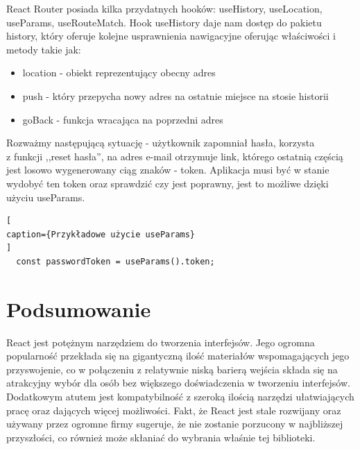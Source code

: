 \documentclass[oneside,polski,logo,indent]{amuthesis}
\begin{document}
React Router posiada kilka przydatnych hooków: useHistory, useLocation, useParams, useRouteMatch. Hook useHistory daje nam dostęp do pakietu history, który oferuje kolejne usprawnienia 
nawigacyjne oferując właściwości i metody takie jak:
\begin{itemize}
\item location - obiekt reprezentujący obecny adres
\item push - który przepycha nowy adres na ostatnie miejsce na stosie historii
\item goBack - funkcja wracająca na poprzedni adres
\end{itemize}
Rozważmy następującą sytuację - użytkownik zapomniał hasła, korzysta \\z funkcji ,,reset hasła'', na adres e-mail otrzymuje link, którego ostatnią częścią
jest losowo wygenerowany ciąg znaków - token. Aplikacja musi być w stanie wydobyć ten token oraz sprawdzić czy jest poprawny, jest to możliwe dzięki użyciu useParams.
\begin{lstlisting}[
caption={Przykładowe użycie useParams}
]
  const passwordToken = useParams().token;

\end{lstlisting}




\section{Podsumowanie}
React jest potężnym narzędziem do tworzenia interfejsów. Jego ogromna popularność przekłada się na gigantyczną ilość materiałów wspomagających jego przyswojenie, co w połączeniu z relatywnie niską barierą wejścia składa się na atrakcyjny wybór dla osób bez większego doświadczenia w tworzeniu interfejsów.
Dodatkowym atutem jest kompatybilność z szeroką ilością narzędzi ułatwiających pracę oraz dających więcej możliwości. Fakt, że React jest stale rozwijany oraz używany przez ogromne firmy
sugeruje, że nie zostanie porzucony w najbliższej przyszłości, co również może skłaniać do wybrania właśnie tej biblioteki.

\nocite{*}


\printbibliography
\end{document}
